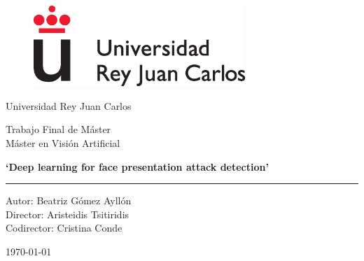 \documentclass[a4paper,openright,12pt]{report}
\begin{document}
\begin{titlepage}

\begin{center}
\vspace*{-1in}
\begin{figure}[htb]
\begin{center}
\includegraphics[width=8cm]{images_miscelaneus/logoURJC.eps}
\end{center}
\end{figure}
Universidad Rey Juan Carlos\\
\vspace*{1.1in}
\begin{Large}
 Trabajo Final de M\'aster\\
 \vspace*{0.05in}
 M\'aster en Visi\'on Artificial\\
 \end{Large}
\vspace*{0.8in}


\begin{LARGE}
\textbf{`Deep learning for face presentation attack detection'} \\
\end{LARGE}

\vspace*{1.9in}
\rule{80mm}{0.1mm}
\vspace*{0.04in}

\begin{large}
Autor: Beatriz G\'omez Ayll\'on\\
\vspace*{0.08in}
Director: Aristeidis Tsitiridis\\
\vspace*{0.08in}
Codirector: Cristina Conde\\
\end{large}

\vspace*{0.75in}
\today

\end{center}

\end{titlepage}
\end{document}
